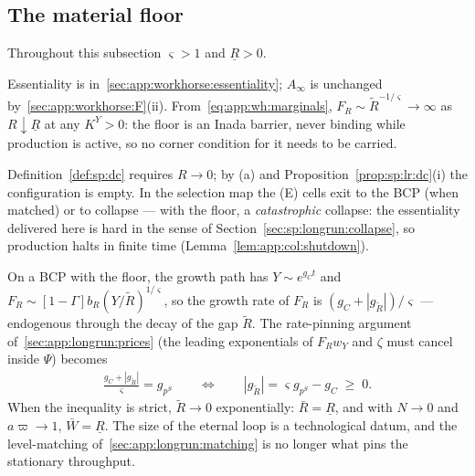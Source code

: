 \subsection{The material floor}\label{sec:app:workhorse:floor}

Throughout this subsection $\varsigma>1$ and $\underline R>0$.

 Essentiality is
in~\ref{sec:app:workhorse:essentiality}; $A_\infty$ is unchanged
by~\ref{sec:app:workhorse:F}(ii). From~\eqref{eq:app:wh:marginals},
$F_R\sim\tilde R^{-1/\varsigma}\to\infty$ as $R\downarrow\underline R$ at any $K^Y>0$: the
floor is an Inada barrier, never binding while production is active, so no corner condition
for it needs to be carried.

 Definition~\ref{def:sp:dc} requires $R\to0$; by (a)
and Proposition~\ref{prop:sp:lr:dc}(i) the configuration is empty. In the selection map the
(E) cells exit to the BCP (when matched) or to collapse --- with the floor, a
\emph{catastrophic} collapse: the essentiality delivered here is hard in the sense of
Section~\ref{sec:sp:longrun:collapse}, so production halts in finite time
(Lemma~\ref{lem:app:col:shutdown}).

 On a BCP with the floor, the growth path has
$Y\sim e^{g_Ct}$ and
$F_R\sim\left[1-\Gamma\right]b_R\left(Y/\tilde R\right)^{1/\varsigma}$, so the growth rate of
$F_R$ is $\left(g_C+\left|g_{\tilde R}\right|\right)/\varsigma$ --- endogenous through the
decay of the gap $\tilde R$. The rate-pinning argument of~\ref{sec:app:longrun:prices}
(the leading exponentials of $F_Rw_Y$ and $\zeta$ must cancel inside $\Psi$) becomes
\begin{align}
\frac{g_C+\left|g_{\tilde R}\right|}{\varsigma}=g_{p^S}
\qquad\Longleftrightarrow\qquad
\left|g_{\tilde R}\right|=\varsigma g_{p^S}-g_C\;\ge\;0 .
\label{eq:app:wh:gapfloor}
\end{align}
When the inequality is strict, $\tilde R\to0$ exponentially: $\bar R=\underline R$, and with
$N\to0$ and $a\varpi\to1$, $\bar W=\underline R$. The size of the eternal loop is a
technological datum, and the level-matching of~\ref{sec:app:longrun:matching} is no longer
what pins the stationary throughput.

